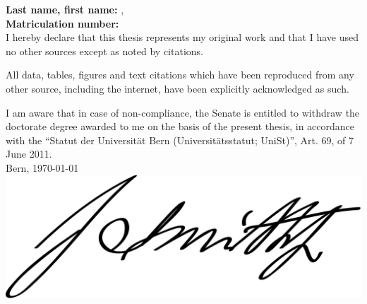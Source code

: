 \documentclass[
11pt, %
english, %
singlespacing, %
headsepline, %
]{MastersDoctoralThesis} %
\begin{document}
\cleardoublepage

% 


\begin{declaration}
\addchaptertocentry{\authorshipname} %
\setlength\parindent{0pt} %

{\noindent\huge\bfseries\authorshipname\par\vspace{10pt}}
\vspace*{5mm}
\textbf{Last name, first name:} \lname, \fname\\[3mm]
\textbf{Matriculation number:} \matrnumber\\[1.2cm]

I hereby declare that this thesis represents my original work and that I have used no other sources except as noted by citations. 
    
All data, tables, figures and text citations which have been reproduced from any other source, including the internet, have been explicitly acknowledged as such. 
    
I am aware that in case of non-compliance, the Senate is entitled to withdraw the doctorate degree awarded to me on the basis of the present thesis, in accordance with the “Statut der Universität Bern (Universitätsstatut; UniSt)”, Art. 69, of 7 June 2011.\\[1.5cm]

Bern, \today\\[4mm]

\includegraphics[scale = 0.15]{Extra/signature.png}\\[3mm]
\authorname


\end{declaration}


\end{document}
